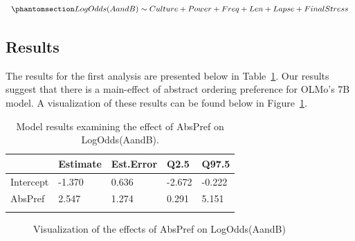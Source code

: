 \documentclass[
  nottoc]{article}
\begin{document}
\begin{equation}\phantomsection\label{eq-m2}{
LogOdds(AandB) \sim Culture + Power + Freq + Len + Lapse + FinalStress
}\end{equation}

\subsection{Results}\label{results}

The results for the first analysis are presented below in
Table~\ref{tbl-exp1m1}. Our results suggest that there is a main-effect
of abstract ordering preference for OLMo's 7B model. A visualization of
these results can be found below in Figure~\ref{fig-exp1m1}.

\begin{longtable}[]{@{}lllll@{}}

\toprule\noalign{}
& Estimate & Est.Error & Q2.5 & Q97.5 \\
\midrule\noalign{}
\endhead
\bottomrule\noalign{}
\endlastfoot
Intercept & -1.370 & 0.636 & -2.672 & -0.222 \\
AbsPref & 2.547 & 1.274 & 0.291 & 5.151 \\


\caption{\label{tbl-exp1m1}Model results examining the effect of AbsPref
on LogOdds(AandB).}

\tabularnewline
\end{longtable}

\begin{figure}


\caption{\label{fig-exp1m1}Visualization of the effects of AbsPref on
LogOdds(AandB)}

\end{figure}%
\end{document}

